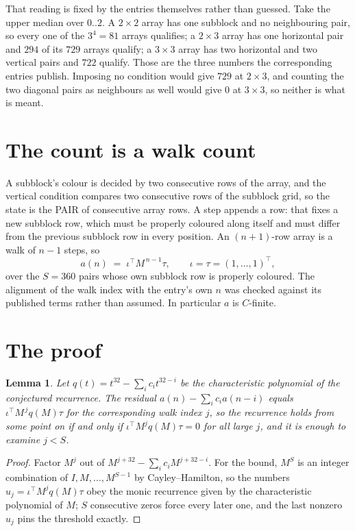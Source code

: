 \documentclass[11pt,a4paper]{article}
\theoremstyle{plain}
\newtheorem{lemma}[theorem]{Lemma}
\theoremstyle{definition}
\begin{document}
That reading is fixed by the entries themselves rather than guessed. Take the upper median
over $0..2$. A $2\times2$ array has one subblock and no neighbouring pair, so every one of the
$3^4=81$ arrays qualifies; a $2\times3$ array has one horizontal pair and $294$ of its $729$
arrays qualify; a $3\times3$ array has two horizontal and two vertical pairs and $722$
qualify. Those are the three numbers the corresponding entries publish. Imposing no condition
would give $729$ at $2\times3$, and counting the two diagonal pairs as neighbours as well
would give $0$ at $3\times3$, so neither is what is meant.

\section{The count is a walk count}

A subblock's colour is decided by two consecutive rows of the array, and
the vertical condition compares two consecutive rows of the subblock grid, so the state is the
PAIR of consecutive array rows. A step appends a row: that fixes a new subblock row, which
must be properly coloured along itself and must differ from the previous subblock row in every
position. An $(n+1)$-row array is a walk of $n-1$ steps, so
\[
a(n)\;=\;\iota^{\!\top}M^{\,n-1}\tau,\qquad\iota=\tau=(1,\dots,1)^{\!\top},
\]
over the $S=360$ pairs whose own subblock row is properly coloured.
The alignment of the walk index with the entry's own $n$ was checked against its published
terms rather than assumed. In particular $a$ is $C$-finite.

\section{The proof}

\begin{lemma}\label{lem:crit}
Let $q(t)=t^{32}-\sum_i c_it^{32-i}$ be the characteristic polynomial of the
conjectured recurrence. The residual $a(n)-\sum_ic_ia(n-i)$ equals
$\iota^{\!\top}M^{\,j}q(M)\tau$ for the corresponding walk index $j$, so the recurrence
holds from some point on if and only if $\iota^{\!\top}M^{j}q(M)\tau=0$ for all large $j$,
and it is enough to examine $j<S$.
\end{lemma}

\begin{proof}
Factor $M^{j}$ out of $M^{j+32}-\sum_ic_iM^{j+32-i}$. For the bound, $M^{S}$
is an integer combination of $I,M,\dots,M^{S-1}$ by Cayley--Hamilton, so the numbers
$u_j=\iota^{\!\top}M^{j}q(M)\tau$ obey the monic recurrence given by the characteristic
polynomial of $M$; $S$ consecutive zeros force every later one, and the last nonzero $u_j$
pins the threshold exactly.
\end{proof}
\end{document}
